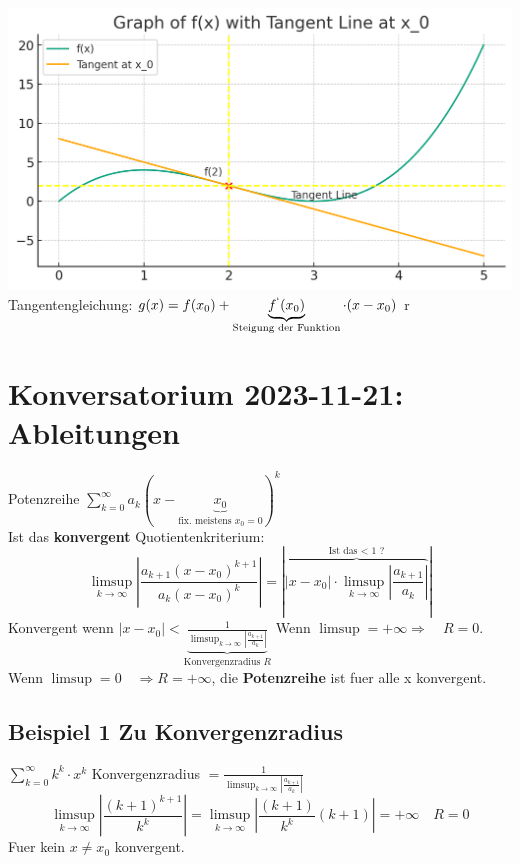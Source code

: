 \documentclass{article}
\theoremstyle{mytheoremstyle}
\theoremstyle{mytheoremstyle}
\theoremstyle{myproblemstyle}
\begin{document}
        \includegraphics[width=1\textwidth]{3.6.4-tangente.png}
        Tangentengleichung: $g(x) = f(x_0) + \underbrace{f^`(x_0)}_{\text{Steigung der Funktion}} \cdot (x-x_0)$ r

    \section{Konversatorium 2023-11-21: \textbf{Ableitungen}}

    Potenzreihe $\sum_{k=0}^{\infty } a_k (x-\underbrace{x_0}_{\text{fix. meistens $x_0 = 0$}})^k$ \\ 
    Ist das \textbf{konvergent} Quotientenkriterium: 
    \[
    \limsup_{k \to \infty } \left| \frac{a_{k+1}(x-x_0)^{k+1}}{a_k(x-x_0)^k} \right| = \left| \overbrace{\left| x-x_0 \right| \cdot \limsup _{k \to \infty } \left| \frac{a_{k+1}}{a_k} \right|}^{\text{Ist das < 1 ?}} \right|
    \]
    Konvergent wenn $\left| x- x_0 \right| < \underbrace{\frac{1}{\limsup _{k \to \infty } \left| \frac{a_{k+1}}{a_k} \right|}}_{\text{Konvergenzradius $R$}}$
    Wenn $\limsup = + \infty \Rightarrow \quad R = 0$. \\ 
    Wenn $\limsup = 0 \quad \Rightarrow R = + \infty $, die \textbf{Potenzreihe} ist fuer alle x konvergent. \\
    
    \bigskip

    \subsection{Beispiel 1 Zu Konvergenzradius}
    $\sum_{k=0}^{\infty } k^k \cdot x^k$ Konvergenzradius $= \frac{1}{\limsup _{k \to \infty } \left| \frac{a_{k+1}}{a_k} \right|}$ \\ 
    \[
        \limsup _{k \to \infty } \left| \frac{(k+1)^{k+1}}{k^k} \right|  
        = \limsup _ {k \to \infty } \left| \frac{(k+1)}{k^k} (k+1)\right| = + \infty \quad R = 0 
    \]  
    Fuer kein $x \not = x_0 $ konvergent. 
\end{document}
